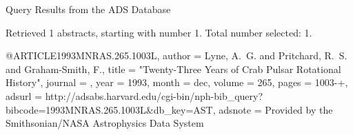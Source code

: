 Query Results from the ADS Database


Retrieved 1 abstracts, starting with number 1.  Total number selected: 1.

@ARTICLE{1993MNRAS.265.1003L,
   author = {{Lyne}, A.~G. and {Pritchard}, R.~S. and {Graham-Smith}, F.},
    title = "{Twenty-Three Years of Crab Pulsar Rotational History}",
  journal = {\mnras},
     year = 1993,
    month = dec,
   volume = 265,
    pages = {1003-+},
   adsurl = {http://adsabs.harvard.edu/cgi-bin/nph-bib_query?bibcode=1993MNRAS.265.1003L&db_key=AST},
  adsnote = {Provided by the Smithsonian/NASA Astrophysics Data System}
}



